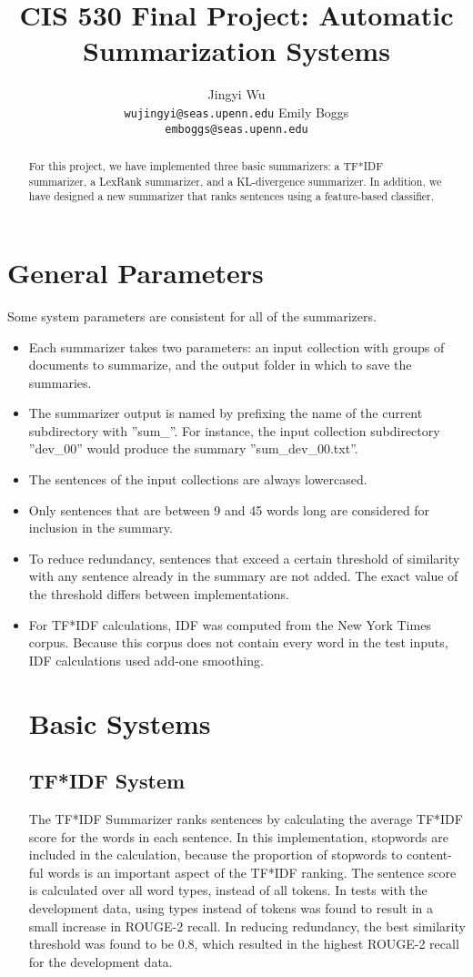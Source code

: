 \documentclass[11pt,letterpaper]{article}
\title{CIS 530 Final Project: Automatic Summarization Systems}
\author{Jingyi Wu \\
	    {\tt wujingyi@seas.upenn.edu}
	  \And
    Emily Boggs\\
  {\tt emboggs@seas.upenn.edu}}
\begin{document}
\maketitle
\begin{abstract}
For this project, we have implemented three basic summarizers: a TF*IDF summarizer, a LexRank summarizer, and a KL-divergence summarizer. In addition, we have designed a new summarizer that ranks sentences using a feature-based classifier.
\end{abstract}

\section{General Parameters}
Some system parameters are consistent for all of the summarizers. 
\begin{itemize}
\item Each summarizer takes two parameters: an input collection with groups of documents to summarize, and the output folder in which to save the summaries.
\item The summarizer output is named by prefixing the name of the current subdirectory with ''sum\_''. For instance, the input collection subdirectory ''dev\_00'' would produce the summary ''sum\_dev\_00.txt''.
\item The sentences of the input collections are always lowercased. 
\item Only sentences that are between 9 and 45 words long are considered for inclusion in the summary.
\item To reduce redundancy, sentences that exceed a certain threshold of similarity with any sentence already in the summary are not added. The exact value of the threshold differs between implementations.
\item For TF*IDF calculations, IDF was computed from the New York Times corpus. Because this corpus does not contain every word in the test inputs, IDF calculations used add-one smoothing.


\section{Basic Systems}

\subsection{TF*IDF System}
The TF*IDF Summarizer ranks sentences by calculating the average TF*IDF score for the words in each sentence. In this implementation, stopwords are included in the calculation, because the proportion of stopwords to content-ful words is an important aspect of the TF*IDF ranking.
The sentence score is calculated over all word types, instead of all tokens. In tests with the development data, using types instead of tokens was found to result in a small increase in ROUGE-2 recall.
In reducing redundancy, the best similarity threshold was found to be 0.8, which resulted in the highest ROUGE-2 recall for the development data. 


\end{itemize}
\end{document}
